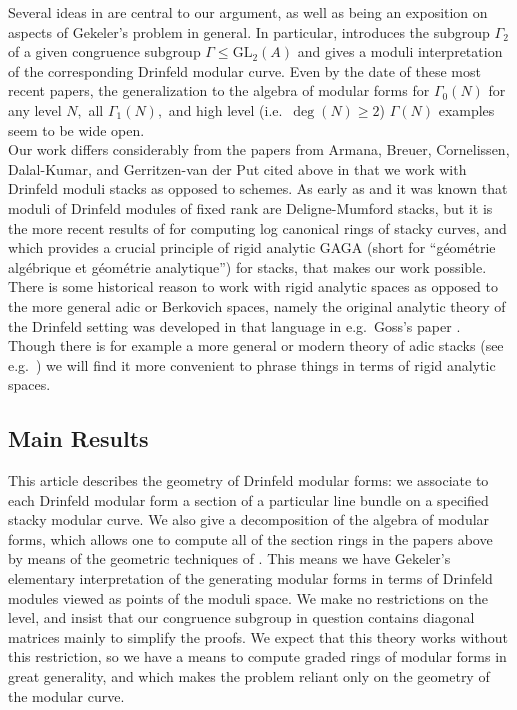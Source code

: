 \documentclass[11pt]{amsart}
\theoremstyle{definition}
\numberwithin{equation}{section}
\newcommand{\GL}{\mathrm{GL}} 	%
\begin{document}
		Several ideas in \cite{Breuer-Gekeler-h-function} are central to our argument, as well as being an exposition on aspects of Gekeler's problem in general. In particular, \cite{Breuer-Gekeler-h-function} introduces the subgroup $\Gamma_2$ of a given congruence subgroup $\Gamma\leq\GL_2(A)$ and gives a moduli interpretation of the corresponding Drinfeld modular curve. Even by the date of these most recent papers, the generalization to the algebra of modular forms for $\Gamma_0(N)$ for any level $N,$ all $\Gamma_1(N),$ and high level (i.e.\ $\deg(N)\geq 2$) $\Gamma(N)$ examples seem to be wide open.\\
		
		Our work differs considerably from the papers from Armana, Breuer, Cornelissen, Dalal-Kumar, and Gerritzen-van der Put cited above in that we work with Drinfeld moduli stacks as opposed to schemes. As early as \cite{Gekeler-Curves} and \cite{Laumon-cohomology-Drinfeld-modular-varieties} it was known that moduli of Drinfeld modules of fixed rank are Deligne-Mumford stacks, but it is the more recent results of \cite{VZB} for computing log canonical rings of stacky curves, and \cite{Porta-Yu-Higher-analytic-stacks-GAGA} which provides a crucial principle of rigid analytic GAGA (short for ``g\'eom\'etrie alg\'ebrique et g\'eom\'etrie analytique'') for stacks, that makes our work possible.\\
		
		There is some historical reason to work with rigid analytic spaces as opposed to the more general adic or Berkovich spaces, namely the original analytic theory of the Drinfeld setting was developed in that language in e.g.\ Goss's paper \cite{Goss-upper-halfplane}. Though there is for example a more general or modern theory of adic stacks (see e.g.\ \cite{Warner-thesis-adic-moduli-spaces}) we will find it more convenient to phrase things in terms of rigid analytic spaces.
		
		\subsection{Main Results}
		
		This article describes the geometry of Drinfeld modular forms: we associate to each Drinfeld modular form a section of a particular line bundle on a specified stacky modular curve.
		We also give a decomposition of the algebra of modular forms, which allows one to compute all of the section rings in the papers above by means of the geometric techniques of \cite{VZB}. This means we have Gekeler's elementary interpretation of the generating modular forms in terms of Drinfeld modules viewed as points of the moduli space. We make no restrictions on the level, and insist that our congruence subgroup in question contains diagonal matrices mainly to simplify the proofs. We expect that this theory works without this restriction, so we have a means to compute graded rings of modular forms in great generality, and which makes the problem reliant only on the geometry of the modular curve.\\   
		
\end{document}
